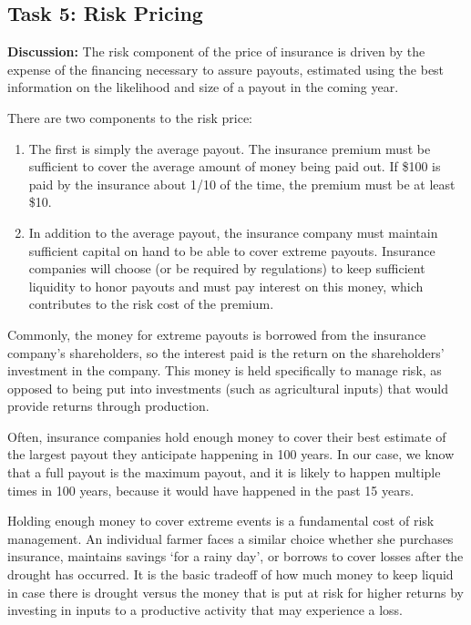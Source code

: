 \documentclass[letterpaper,10pt,english]{sphinxmanual}
\begin{document}
\subsection{Task 5: Risk Pricing}
\label{wiiet/wiiet_influenceshortdatasets_Web:task-5-risk-pricing}
\textbf{Discussion:} The risk component of the price of insurance is driven by the expense of the financing necessary to assure payouts, estimated using the best information on the likelihood and size of a payout in the coming year.

There are two components to the risk price:
\begin{enumerate}
\item {} 
The first is simply the average payout. The insurance premium must be sufficient to cover the average amount of money being paid out. If \$100 is paid by the insurance about 1/10 of the time, the premium must be at least \$10.

\item {} 
In addition to the average payout, the insurance company must maintain sufficient capital on hand to be able to cover extreme payouts. Insurance companies will choose (or be required by regulations) to keep sufficient liquidity to honor payouts and must pay interest on this money, which contributes to the risk cost of the premium.

\end{enumerate}

Commonly, the money for extreme payouts is borrowed from the insurance company's shareholders, so the interest paid is the return on the shareholders' investment in the company. This money is held specifically to manage risk, as opposed to being put into investments (such as agricultural inputs) that would provide returns through production.

Often, insurance companies hold enough money to cover their best estimate of the largest payout they anticipate happening in 100 years. In our case, we know that a full payout is the maximum payout, and it is likely to happen multiple times in 100 years, because it would have happened in the past 15 years.

Holding enough money to cover extreme events is a fundamental cost of risk management. An individual farmer faces a similar choice whether she purchases insurance, maintains savings `for a rainy day', or borrows to cover losses after the drought has occurred. It is the basic tradeoff of how much money to keep liquid in case there is drought versus the money that is put at risk for higher returns by investing in inputs to a productive activity that may experience a loss.
\end{document}
